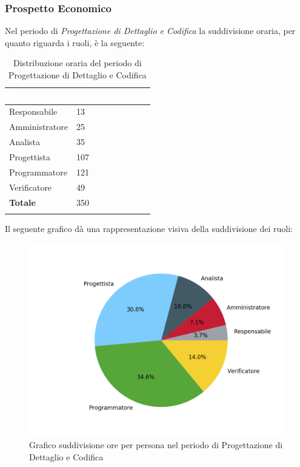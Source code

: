 \subsubsection{Prospetto Economico}

Nel periodo di \textit{Progettazione di Dettaglio e Codifica} la suddivisione oraria, per quanto riguarda i ruoli, è la seguente: 

\begin{longtable}{| C{.30\textwidth}| C{.15\textwidth}| C{.20\textwidth}|}
	\hline
	\textbf{\textcolor{white}{Ruolo}} & \textbf{\textcolor{white}{Ore}} & \textbf{\textcolor{white}{Costo in \euro}} \\
	\hline 
	Responsabile & 13 &  \\
	\hline
	Amministratore & 25 & \\
	\hline
	Analista & 35 &  \\
	\hline
	Progettista & 107 &  \\
	\hline
	Programmatore & 121 &  \\
	\hline
	Verificatore & 49 &  \\
	\hline
	\textbf{Totale} & 350 & \\ 
	\hline
	
	\caption{Distribuzione oraria del periodo di Progettazione di Dettaglio e Codifica}
	\label{Distribuzione oraria dei ruoli pdc}
\end{longtable}

Il seguente grafico dà una rappresentazione visiva della suddivisione dei ruoli:
\begin{figure}[H]
	\centering
	\includegraphics[width=1\linewidth]{./images/torta_pdc.png}
	\caption{Grafico suddivisione ore per persona nel periodo di Progettazione di Dettaglio e Codifica}
	\label{fig:grafico suddivione ruoli periodo pdc}
\end{figure}

